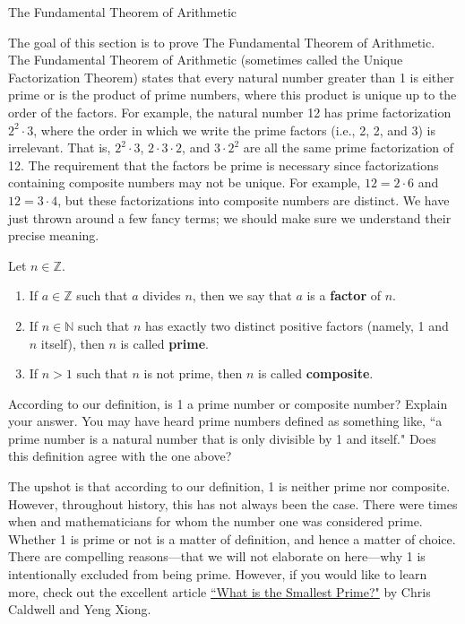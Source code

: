 \begin{section}{The Fundamental Theorem of Arithmetic}\label{sec:FTA}

The goal of this section is to prove The Fundamental Theorem of Arithmetic.  The Fundamental Theorem of Arithmetic (sometimes called the Unique Factorization Theorem) states that every natural number greater than 1 is either prime or is the product of prime numbers, where this product is unique up to the order of the factors. For example, the natural number 12 has prime factorization $2^2\cdot 3$, where the order in which we write the prime factors (i.e., 2, 2, and 3) is irrelevant. That is, $2^2\cdot 3$, $2\cdot 3\cdot2$, and $3\cdot 2^2$ are all the same prime factorization of 12. The requirement that the factors be prime is necessary since factorizations containing composite numbers may not be unique. For example, $12=2\cdot 6$ and $12=3\cdot 4$, but these factorizations into composite numbers are distinct. We have just thrown around a few fancy terms; we should make sure we understand their precise meaning.

\begin{definition}
Let $n\in\mathbb{Z}$.
\begin{enumerate}[label=\textrm{(\alph*)}]
\item If $a\in \mathbb{Z}$ such that $a$ divides $n$, then we say that $a$ is a \textbf{factor} of $n$.
\item If $n\in \mathbb{N}$ such that $n$ has exactly two distinct positive factors (namely, 1 and $n$ itself), then $n$ is called \textbf{prime}.
\item If $n>1$ such that $n$ is not prime, then $n$ is called \textbf{composite}.
\end{enumerate}
\end{definition}

\begin{problem}
According to our definition, is 1 a prime number or composite number?  Explain your answer. You may have heard prime numbers defined as something like, ``a prime number is a natural number that is only divisible by 1 and itself."  Does this definition agree with the one above?
\end{problem}

The upshot is that according to our definition, 1 is neither prime nor composite.  However, throughout history, this has not always been the case.  There were times when and mathematicians for whom the number one was considered prime.  Whether 1 is prime or not is a matter of definition, and hence a matter of choice.  There are compelling reasons---that we will not elaborate on here---why 1 is intentionally excluded from being prime.  However, if you would like to learn more, check out the excellent article \href{https://cs.uwaterloo.ca/journals/JIS/VOL15/Caldwell1/cald5.pdf}{``What is the Smallest Prime?"} by Chris Caldwell and Yeng Xiong.


\end{section}
